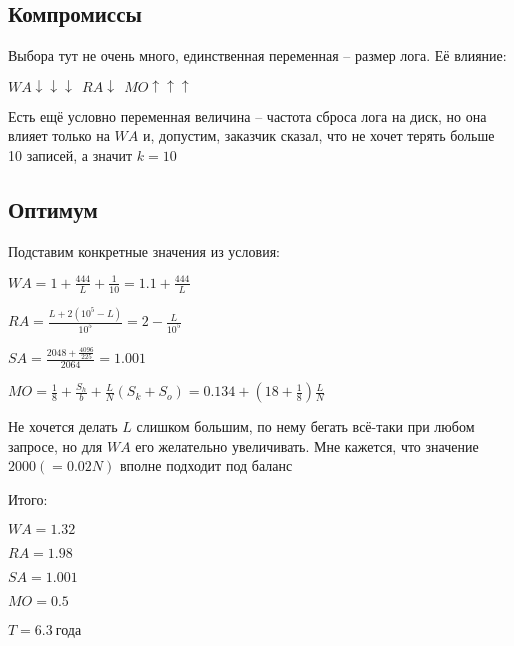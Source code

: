 \subsection*{Компромиссы}

Выбора тут не очень много, единственная переменная -- размер лога. Её влияние:

$WA\downarrow\downarrow\downarrow\ \ RA \downarrow\ \ MO \uparrow\uparrow\uparrow$

Есть ещё условно переменная величина -- частота сброса лога на диск, но она влияет только на $WA$ и, допустим, заказчик сказал, что не хочет терять больше 10 записей, а значит $k = 10$

\subsection*{Оптимум}

Подставим конкретные значения из условия:

\large$WA = 1 + \frac{444}{L} + \frac{1}{10} = 1.1 + \frac{444}{L}$\normalsize

\large$RA = \frac{L + 2(10^5-L)}{10^5} = 2 - \frac{L}{10^5}$\normalsize

\large$SA = \frac{2048 + \frac{4096}{225}}{2064} = 1.001$\normalsize

\large$MO = \frac{1}{8} + \frac{S_h}{b} + \frac{L}{N}(S_k + S_o) = 0.134 + (18+\frac{1}{8})\frac{L}{N}$\normalsize

Не хочется делать $L$ слишком большим, по нему бегать всё-таки при любом запросе, но для $WA$ его желательно увеличивать. Мне кажется, что значение $2000 (=0.02N)$ вполне подходит под баланс

Итого:

\large$WA = 1.32$\normalsize

\large$RA = 1.98$\normalsize

\large$SA = 1.001$\normalsize

\large$MO = 0.5$\normalsize

\large$T = 6.3\ $\normalsize года